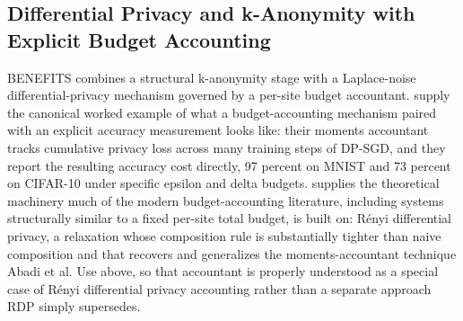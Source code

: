 \subsection{Differential Privacy and k-Anonymity with Explicit Budget Accounting}

BENEFITS combines a structural k-anonymity stage with a Laplace-noise differential-privacy mechanism governed by a per-site budget accountant. \cite{abadi2016} supply the canonical worked example of what a budget-accounting mechanism paired with an explicit accuracy measurement looks like: their moments accountant tracks cumulative privacy loss across many training steps of DP-SGD, and they report the resulting accuracy cost directly, 97 percent on MNIST and 73 percent on CIFAR-10 under specific epsilon and delta budgets. \cite{mironov2017} supplies the theoretical machinery much of the modern budget-accounting literature, including systems structurally similar to a fixed per-site total budget, is built on: Rényi differential privacy, a relaxation whose composition rule is substantially tighter than naive composition and that recovers and generalizes the moments-accountant technique Abadi et al. Use above, so that accountant is properly understood as a special case of Rényi differential privacy accounting rather than a separate approach RDP simply supersedes.

